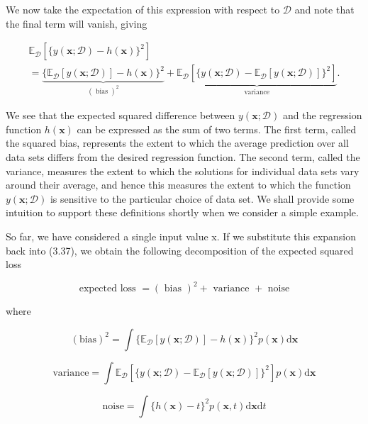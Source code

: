 \documentclass[
  10
]{article}
\begin{document}
We now take the expectation of this expression with respect to
\(\mathcal { D }\) and note that the final term will vanish, giving

\[
\begin{array}{l} \mathbb {E} _ {\mathcal {D}} \left[ \{y (\mathbf {x}; \mathcal {D}) - h (\mathbf {x}) \} ^ {2} \right] \\ = \underbrace {\{\mathbb {E} _ {\mathcal {D}} [ y (\mathbf {x} ; \mathcal {D}) ] - h (\mathbf {x}) \} ^ {2}} _ {(\text { bias }) ^ {2}} + \underbrace {\mathbb {E} _ {\mathcal {D}} \left[ \{y (\mathbf {x} ; \mathcal {D}) - \mathbb {E} _ {\mathcal {D}} [ y (\mathbf {x} ; \mathcal {D}) ] \} ^ {2} \right]} _ {\text { variance }}. \end{array}\tag{3.40}
\]

We see that the expected squared difference between
\(y ( \mathbf { x } ; \mathcal { D } )\) and the regression function
\(h ( \mathbf { x } )\) can be expressed as the sum of two terms. The
first term, called the squared bias, represents the extent to which the
average prediction over all data sets differs from the desired
regression function. The second term, called the variance, measures the
extent to which the solutions for individual data sets vary around their
average, and hence this measures the extent to which the function
\(y ( \mathbf { x } ; \mathcal { D } )\) is sensitive to the particular
choice of data set. We shall provide some intuition to support these
definitions shortly when we consider a simple example.

So far, we have considered a single input value x. If we substitute this
expansion back into (3.37), we obtain the following decomposition of the
expected squared loss

\[
\text { expected   loss } = (\text { bias }) ^ {2} + \text { variance } + \text { noise }\tag{3.41}
\]

where

\[
(\mathrm{bias}) ^ {2} = \int \{\mathbb {E} _ {\mathcal {D}} [ y (\mathbf {x}; \mathcal {D}) ] - h (\mathbf {x}) \} ^ {2} p (\mathbf {x})   \mathrm{d} \mathbf {x}\tag{3.42}
\]

\[
\mathrm{variance} = \int \mathbb {E} _ {\mathcal {D}} \left[ \{y (\mathbf {x}; \mathcal {D}) - \mathbb {E} _ {\mathcal {D}} [ y (\mathbf {x}; \mathcal {D}) ] \} ^ {2} \right] p (\mathbf {x}) \mathrm{d} \mathbf {x}\tag{3.43}
\]

\[
\mathrm{noise} = \int \{h (\mathbf {x}) - t \} ^ {2} p (\mathbf {x}, t) \mathrm{d} \mathbf {x} \mathrm{d} t\tag{3.44}
\]
\end{document}
